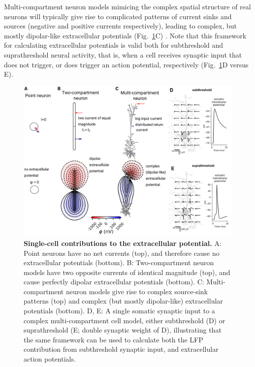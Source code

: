 \documentclass[preprint,11pt,authoryear]{elsarticle}
\begin{document}
Multi-compartment neuron models mimicing the complex spatial structure of real neurons will typically give rise to complicated patterns of current sinks and sources (negative and positive currents respectively), leading to complex, but mostly dipolar-like extracellular potentials (Fig.~\ref{fig:EP_morph}C) \citep{Einevoll2007}.
Note that this framework for calculating extracellular potentials is valid both for subthreshold and suprathreshold neural activity, that is, when a cell receives synaptic input that does not trigger, or does trigger an action potential, respectively (Fig.~\ref{fig:EP_morph}D versus E).  

\begin{figure}[!ht]
\begin{center}
\includegraphics[width=1\textwidth]{single_cell_EP}
\end{center}
\caption{\textbf{Single-cell contributions to the extracellular potential.} 
A: Point neurons have no net currents (top), and therefore cause no extracellular potentials (bottom). B: Two-compartment neuron models have two opposite currents
of identical magnitude (top), and cause perfectly dipolar extracellular potentials (bottom). C: Multi-compartment neuron models \citep{Hay2011} give rise to complex source-sink patterns (top) and complex (but mostly dipolar-like) extracellular potentials (bottom). D, E: A single somatic synaptic input to a complex multi-compartment cell model, either subthreshold (D) or suprathreshold (E; double synaptic weight of D), illustrating that the same framework can be used to calculate both the LFP contribution from subthreshold synaptic input, and extracellular action potentials. 
}
\label{fig:EP_morph}
\end{figure}
\end{document}
